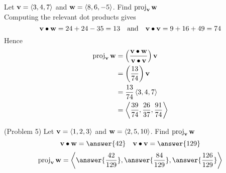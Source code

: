 \documentclass[handout]{ximera}
\begin{document}
\begin{example}[Example 5]
Let $\mathbf v = \left\langle 3,4,7\right\rangle$ and $\mathbf w = \left\langle 8,6,-5\right\rangle$. Find $\operatorname{proj}_{\mathbf{v}} \mathbf{w}$\\
Computing the relevant dot products gives
\[
\mathbf v \bullet \mathbf w = 24+24 -35 = 13 \quad \text{and} \quad \mathbf v \bullet \mathbf v =9 + 16+49 = 74
\]
Hence
\begin{align*}
\operatorname{proj}_{\mathbf{v}} \mathbf{w} &= \left(\frac{\mathbf{v} \bullet \mathbf{w}}{\mathbf{v} \bullet \mathbf{v}}\right) \mathbf{v}\\
                        &= \left(\frac{13}{74}\right) \mathbf v\\
                        &= \frac{13}{74} \left\langle 3,4,7\right\rangle\\
                        &= \left\langle \frac{39}{74},\frac{26}{37},\frac{91}{74}\right\rangle
\end{align*}
\end{example}

\begin{problem}(Problem 5)
Let $\mathbf v = \left\langle 1,2,3\right\rangle$ and $\mathbf w = \left\langle 2,5,10\right\rangle$. Find $\operatorname{proj}_{\mathbf{v}} \mathbf{w}$\\
\[
\vec v \dotp \vec w = \answer{42} \quad \vec v \dotp \vec v = \answer{129} 
\]
\[
 \proj_{\vec{v}} \vec{w} = \vector{\answer{\frac{42}{129}},\answer{\frac{84}{129}},\answer{\frac{126}{129}}}
\]
\end{problem}
\end{document}
